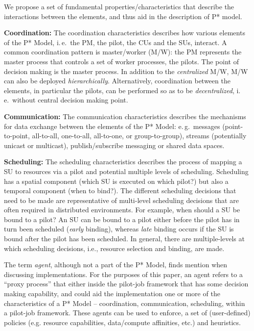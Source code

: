 \documentclass[conference,final]{IEEEtran}
\newcommand{\jhanote}[1]{ {\textcolor{red} { ***shantenu: #1 }}}
\newcommand{\alnote}[1]{ {\textcolor{blue} { ***andrel: #1 }}}
\newcommand{\alnote}[1]{}
\newcommand{\jhanote}[1]{}
\newcommand{\cus}{CUs\xspace}
\begin{document}
We propose a set of fundamental properties/characteristics that
describe the interactions between the elements, and thus aid in the
description of P* model.


\textbf{Coordination:} The coordination characteristics describes how
various elements of the P* Model, i.\,e.\ the PM, the pilot, the \cus
and the SUs, interact. A common coordination pattern is master/worker
(M/W): the PM represents the master process that controls a set of
worker processes, the pilots. The point of decision making is the
master process. In addition to the \emph{centralized} M/W, M/W can
also be deployed \emph{hierarchically}.  Alternatively, coordination
between the elements, in particular the pilots, can be performed so as
to be \emph{decentralized}, i.\,e.\ without central decision making
point.

%

\textbf{Communication:} The communication characteristics describes the
mechanisms for data exchange between the elements of the P* Model:
e.\,g.\ messages (point-to-point, all-to-all, one-to-all, all-to-one,
or group-to-group), streams (potentially unicast or multicast),
publish/subscribe messaging or shared data spaces.
		
\textbf{Scheduling:} The scheduling characteristics describes the
process of mapping a SU to resources via a pilot and potential
multiple levels of scheduling. Scheduling has a spatial component
(which SU is executed on which pilot?) but also a temporal component
(when to bind?). The different scheduling decisions that need to be
made are representative of multi-level scheduling decisions that are
often required in distributed environments.  For example, when should
a SU be bound to a pilot?  An SU can be bound to a pilot either before
the pilot has in turn been scheduled ({\it early} binding), whereas
{\it late} binding occurs if the SU is bound after the pilot has been
scheduled.  In general, there are multiple-levels at which scheduling
decisions, i.e., resource selection and binding, are made.

The term {\it agent}, although not a part of the P* Model, finds
mention when discussing implementations. For the purposes of this
paper, an agent refers to a ``proxy process'' that either inside the
pilot-job framework that has some decision making capability, and
could aid the implementation one or more of the characteristics of a
P* Model -- coordination, communication, scheduling, within a
pilot-job framework.  These agents can be used to enforce, a set of
(user-defined) policies (e.g.  resource capabilities, data/compute
affinities, etc.) and heuristics.
\end{document}
